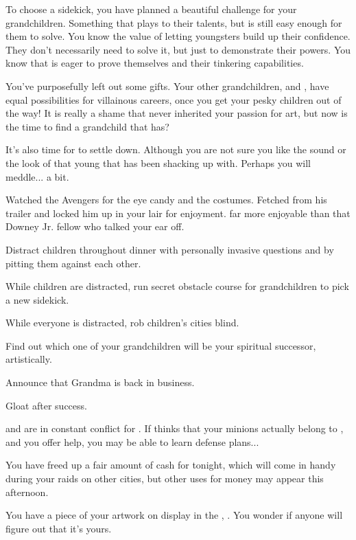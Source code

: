 \documentclass[char]{LRSguildcamp1}
\begin{document}
To choose a sidekick, you have planned a beautiful challenge for your grandchildren. Something that plays to their talents, but is still easy enough for them to solve. You know the value of letting youngsters build up their confidence. They don't necessarily need to solve it, but just to demonstrate their powers. You know that \cTeen{} is eager to prove themselves and their tinkering capabilities. 

You've purposefully left out some gifts. Your other grandchildren, \cGrad{} and \cTween{}, have equal possibilities for villainous careers, once you get your pesky children out of the way! It is really a shame that \cYoungest {} never inherited your passion for art, but now is the time to find a grandchild that has? 

It's also time for \cYoungest {} to settle down. Although you are not sure you like the sound or the look of that young \cYS{\hero} that \cYoungest{} has been shacking up with. Perhaps you will meddle... a bit. 

Watched the Avengers for the eye candy and the costumes. Fetched \cChrisHemsworth{\intro} from his trailer and locked him up in your lair for enjoyment. \cChrisHemsworth{\Theyare} far more enjoyable than that Downey Jr. fellow who talked your ear off. 

\begin{itemz}[Goals]
	\item Distract children throughout dinner with personally invasive questions and by pitting them against each other. 
	\item While children are distracted, run secret obstacle course for grandchildren to pick a new sidekick. 
	\item While everyone is distracted, rob children's cities blind. 
	\item Find out which one of your grandchildren will be your spiritual successor, artistically. 
	\item Announce that Grandma is back in business. 
	\item Gloat after success. 
	
\end{itemz}

\begin{itemz}[Notes]

	\item \cOldest{} and \cOS{} are in constant conflict for \pCityO{}.  If \cOldest{} thinks that your minions actually belong to \cOS{}, and you offer help, you may be able to learn \cOldest{\their} defense plans...
	\item You have freed up a fair amount of cash for tonight, which will come in handy during your raids on other cities, but other uses for money may appear this afternoon.
	
	\item You have a piece of your artwork on display in the \sArtRoom{}, \iArtworkTwo{}. You wonder if anyone will figure out that it's yours. 

\end{itemz}
\end{document}
